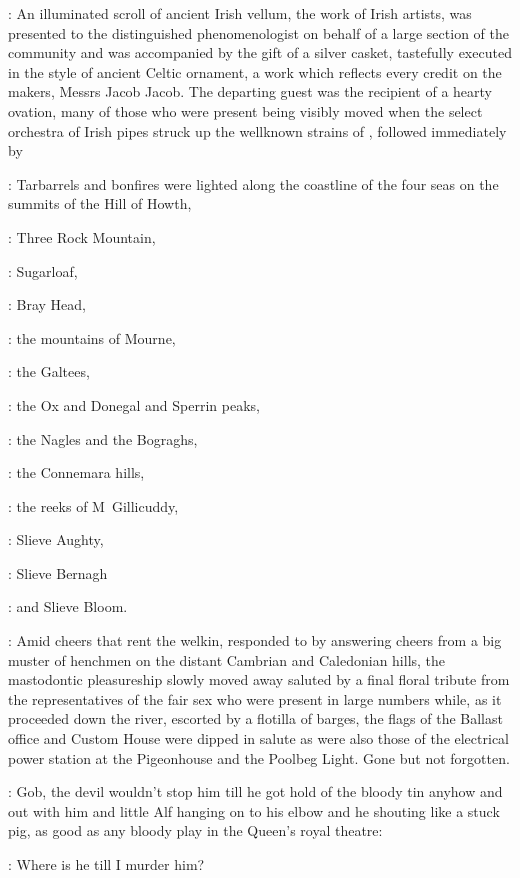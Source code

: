 :
An illuminated scroll of ancient Irish vellum,
the work of Irish artists,
was presented to the
distinguished phenomenologist on behalf of a large section of the
community and was accompanied by the gift of a silver casket,
tastefully executed in the style of ancient Celtic ornament,
a work which reflects
every credit on the makers,
Messrs Jacob  Jacob.
The departing guest
was the recipient of a hearty ovation,
many of those who were present
being visibly moved when the select orchestra of Irish pipes struck up the
wellknown strains of ,
followed immediately by 

:
Tarbarrels and bonfires were lighted along the coastline
of the four seas on the summits of the Hill of Howth,

:
Three Rock Mountain,

:
Sugarloaf,

:
Bray Head,

:
the mountains of Mourne,

:
the Galtees,

:
the Ox and Donegal and Sperrin peaks,

:
the Nagles and the Bograghs,

:
the Connemara hills,

:
the reeks of M~Gillicuddy,

:
Slieve Aughty,

:
Slieve Bernagh

:
and Slieve Bloom.

:
Amid cheers that rent the welkin,
responded to by answering cheers from a big
muster of henchmen on the distant Cambrian and Caledonian hills,
the mastodontic pleasureship slowly moved away saluted by a final floral
tribute from the representatives of the fair sex who were present in large
numbers while,
as it proceeded down the river,
escorted by a flotilla of barges,
the flags of the Ballast office and Custom House were dipped in
salute as were also those of the electrical power station at the
Pigeonhouse and the Poolbeg Light.
Gone but not forgotten.

\Nq:
Gob,
the devil wouldn't stop him till he got hold of the bloody tin
anyhow and out with him and little Alf hanging on to his elbow and he
shouting like a stuck pig,
as good as any bloody play in the Queen's royal theatre:

\citizen:
Where is he till I murder him?

